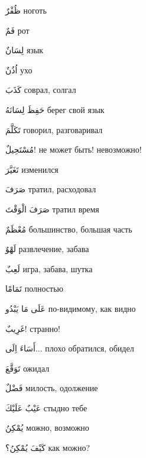 \documentclass[a5paper]{article}
\newcommand\textstyleDropCaps[1]{#1}
\newcommand\textstyleCaptioncharacters[1]{#1}
\begin{document}
\textstyleCaptioncharacters{ظُفْرٌ }\textstyleDropCaps{ноготь‎}

\textstyleCaptioncharacters{فَمٌ }\textstyleDropCaps{рот‎}

\textstyleCaptioncharacters{لِسَانٌ }\textstyleDropCaps{язык‎}

\textstyleCaptioncharacters{اُذُنٌ }\textstyleDropCaps{ухо‎}

\textstyleCaptioncharacters{كَذَبَ }\textstyleDropCaps{соврал, солгал‎}

\textstyleCaptioncharacters{حَفِظَ لِسَانَهُ }\textstyleDropCaps{берег свой язык‎}

\textstyleCaptioncharacters{تَكَلَّمَ }\textstyleDropCaps{говорил, разговари­вал‎}

\textstyleCaptioncharacters{مُسْتَحِيلٌ! }\textstyleDropCaps{не может быть! невозможно!‎}

\textstyleCaptioncharacters{تَغَيَّرَ }\textstyleDropCaps{изменился‎}

\textstyleCaptioncharacters{صَرَفَ }\textstyleDropCaps{тратил, расходовал‎}

\textstyleCaptioncharacters{صَرَفَ الْوَقْتَ }\textstyleDropCaps{тратил вре­мя‎}

\textstyleCaptioncharacters{مُعْظَمٌ }\textstyleDropCaps{большинство, большая часть‎}

\textstyleCaptioncharacters{لَهْوٌ }\textstyleDropCaps{развлечение, забава‎}

\textstyleCaptioncharacters{لَعِبٌ }\textstyleDropCaps{игра, забава, шутка‎}

\textstyleCaptioncharacters{تَمَامًا }\textstyleDropCaps{полностью‎}

\textstyleCaptioncharacters{عَلَى مَا يَبْدُو }\textstyleDropCaps{по-види­мому, как видно‎}

\textstyleCaptioncharacters{غَرِيبٌ!ِ }\textstyleDropCaps{странно!‎}

\textstyleCaptioncharacters{أَسَاءَ اِلَى...ِ }\textstyleDropCaps{плохо обра­тился, обидел‎}

\textstyleCaptioncharacters{تَوَقَّعَ }\textstyleDropCaps{ожидал‎}

\textstyleCaptioncharacters{فَضْلٌ }\textstyleDropCaps{милость, одолжение‎}

\textstyleCaptioncharacters{عَيْبٌ عَلَيْكَ }\textstyleDropCaps{стыдно тебе‎}

\textstyleCaptioncharacters{يُمْكِنُ }\textstyleDropCaps{можно, возможно‎}

\textstyleCaptioncharacters{كَيْفَ يُمْكِنُ؟ }\textstyleDropCaps{как мож­но?‎}
\end{document}
